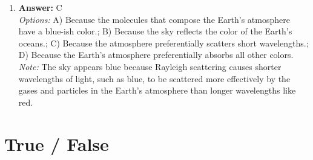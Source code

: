 \documentclass[12pt]{article}
\begin{document}
\begin{enumerate}[label=\arabic*.]
\item \textbf{Answer:} C
\\ \textit{Options:} A) Because the molecules that compose the Earth's atmosphere have a blue-ish color.; B) Because the sky reflects the color of the Earth's oceans.; C) Because the atmosphere preferentially scatters short wavelengths.; D) Because the Earth's atmosphere preferentially absorbs all other colors.
\\ \textit{Note:} The sky appears blue because Rayleigh scattering causes shorter wavelengths of light, such as blue, to be scattered more effectively by the gases and particles in the Earth's atmosphere than longer wavelengths like red.
\end{enumerate}

\section*{True / False}
\end{document}
